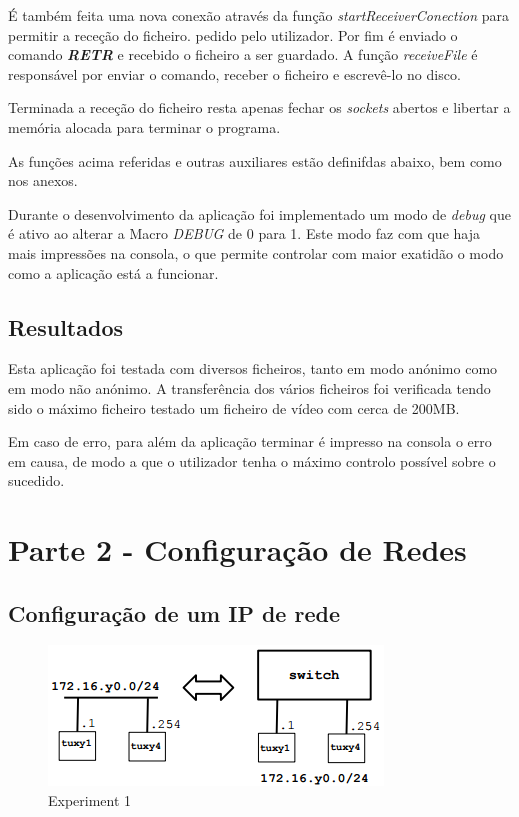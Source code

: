 \documentclass[a4paper]{article}
\begin{document}
	 É também feita uma nova conexão através da função \textit{startReceiverConection} para permitir a receção do ficheiro. pedido pelo utilizador. Por fim é enviado o comando \textbf{\textit{RETR}} e recebido o ficheiro a ser guardado. A função \textit{receiveFile} é responsável por enviar o comando, receber o ficheiro e escrevê-lo no disco.

	Terminada a receção do ficheiro resta apenas fechar os \textit{sockets} abertos e libertar a memória alocada para terminar o programa.

	As funções acima referidas e outras auxiliares estão definifdas abaixo, bem como nos anexos.

	
	\normalsize
	
	Durante o desenvolvimento da aplicação foi implementado um modo de \textit{debug} que é ativo ao alterar a Macro \textit{DEBUG} de 0 para 1. Este modo faz com que haja mais impressões na consola, o que permite controlar com maior exatidão o modo como a aplicação está a funcionar.

	
	\normalsize

	\subsection{Resultados}

	Esta aplicação foi testada com diversos ficheiros, tanto em modo anónimo como em modo não anónimo. A transferência dos vários ficheiros foi verificada tendo sido o máximo ficheiro testado um ficheiro de vídeo com cerca de 200MB.

	Em caso de erro, para além da aplicação terminar é impresso na consola o erro em causa, de modo a que o utilizador tenha o máximo controlo possível sobre o sucedido.

	\section{Parte 2 - Configuração de Redes}
	
	\subsection{Configuração de um IP de rede}

	\begin{figure}[H]
	\begin{center}
  	\includegraphics[width=0.45\linewidth]{exp1.png}
  	\caption{Experiment 1}
  	\label{fig:Experiment 1}
	\end{center}
	\end{figure}
\end{document}
